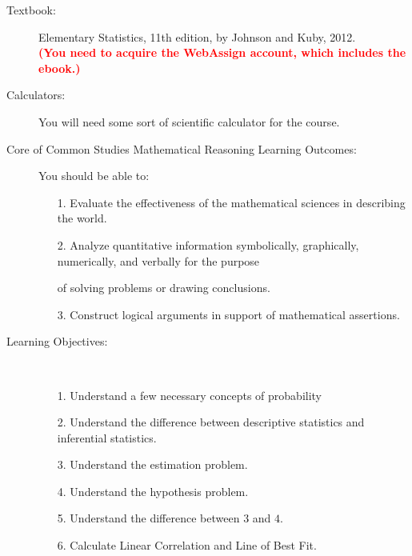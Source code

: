 \documentclass[10pt]{article}
\begin{document}
\begin{description}

\item[Textbook:] Elementary Statistics, 11th edition, by Johnson and Kuby, 2012.\\
\textbf{\textcolor{red}{(You need to acquire the WebAssign account, which includes the ebook.)}}
\vspace{-.1in}
\item[Calculators:] You will need some sort of scientific calculator for the course.
\item[Core of Common Studies Mathematical Reasoning Learning Outcomes:] You should be able to:\vspace{-.1in}
\begin{itemize}
\item[1.] Evaluate the effectiveness of the mathematical sciences in describing the world.\vspace{-.1in}
\item[2.] Analyze quantitative information symbolically, graphically, numerically, and verbally for the purpose \vspace{-.1in}
\item[] of solving problems or drawing conclusions.\vspace{-.1in}
\item[3.] Construct logical arguments in support of mathematical assertions. \vspace{-.1in}
\end{itemize}

\item[Learning Objectives:] \ \vspace{-.1in}
\begin{itemize}
\item[1.] Understand a few necessary concepts of probability\vspace{-.1in}
\item[2.] Understand the difference between descriptive statistics and inferential statistics.\vspace{-.1in}
\item[3.] Understand the estimation problem.\vspace{-.1in}
\item[4.] Understand the hypothesis problem.\vspace{-.1in}
\item[5.] Understand the difference between $3$ and $4$.\vspace{-.1in}
\item[6.] Calculate Linear Correlation and Line of Best Fit.
\end{itemize}


\end{description}
\end{document}
